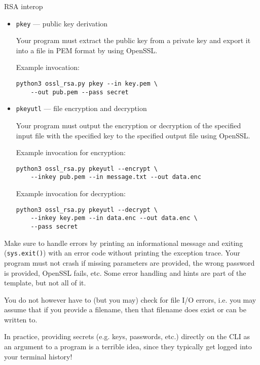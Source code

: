 \documentclass{homework}
\begin{document}
\begin{task}{RSA interop}
\begin{itemize}
    You can see what the expected private key structure looks like by dumping the ASN.1 structure of the example private key given on Moodle.

    Example invocation:
    \begin{Verbatim}
python3 ossl_rsa.py genpkey --out key.pem --pass secret
    \end{Verbatim}

    \item \texttt{pkey} --- public key derivation
    
    Your program must extract the public key from a private key and export it into a file in PEM format by using OpenSSL.

    Example invocation:
    \begin{Verbatim}
python3 ossl_rsa.py pkey --in key.pem \
    --out pub.pem --pass secret
    \end{Verbatim}

    \item \texttt{pkeyutl} --- file encryption and decryption
    
    Your program must output the encryption or decryption of the specified input file with the specified key to the specified output file using OpenSSL.

    Example invocation for encryption:
    \begin{Verbatim}
python3 ossl_rsa.py pkeyutl --encrypt \
    --inkey pub.pem --in message.txt --out data.enc
    \end{Verbatim}

    Example invocation for decryption:
    \begin{Verbatim}
python3 ossl_rsa.py pkeyutl --decrypt \
    --inkey key.pem --in data.enc --out data.enc \
    --pass secret
    \end{Verbatim}
  \end{itemize}

  Make sure to handle errors by printing an informational message and exiting (\texttt{sys.exit()}) with an error code without printing the exception trace.
  Your program must not crash if missing parameters are provided, the wrong password is provided, OpenSSL fails, etc.
  Some error handling and hints are part of the template, but not all of it.

  You do not however have to (but you may) check for file I/O errors, i.e. you may assume that if you provide a filename, then that filename does exist or can be written to.

  \begin{tcolorbox}[title=Reminder]
    In practice, providing secrets (e.g. keys, passwords, etc.) directly on the CLI as an argument to a program is a terrible idea, since they typically get logged into your terminal history!
  \end{tcolorbox}


\end{task}
\end{document}
